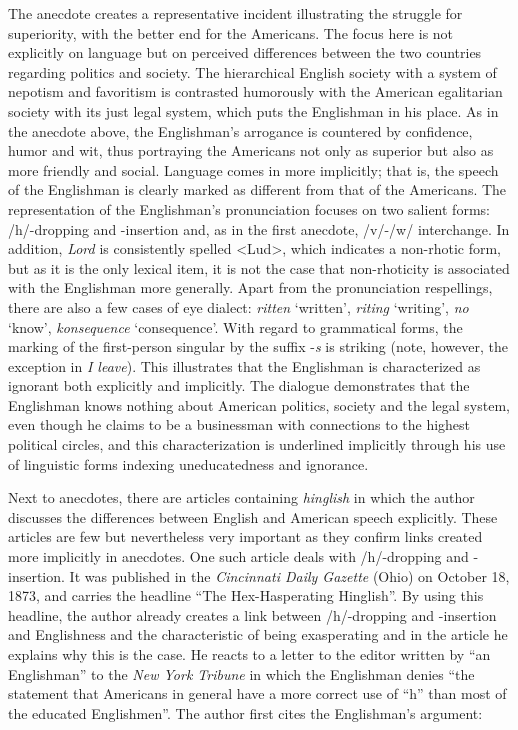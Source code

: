 The anecdote creates a representative incident illustrating the struggle for superiority, with the better end for the Americans. The focus here is not explicitly on language but on perceived differences between the two countries regarding politics and society. The hierarchical English society with a system of nepotism and favoritism is contrasted humorously with the American egalitarian society with its just legal system, which puts the Englishman in his place. As in the anecdote above, the Englishman’s arrogance is countered by confidence, humor and wit, thus portraying the Americans not only as superior but also as more friendly and social. Language comes in more implicitly; that is, the speech of the Englishman is clearly marked as different from that of the Americans. The representation of the Englishman’s pronunciation focuses on two salient forms: /h/-dropping and -insertion and, as in the first anecdote, /v/-/w/ interchange. In addition, \emph{Lord} is consistently spelled <Lud>, which indicates a non-rhotic form, but as it is the only lexical item, it is not the case that non-rhoticity is associated with the Englishman more generally. Apart from the pronunciation respellings, there are also a few cases of eye dialect: \emph{ritten} ‘written’, \emph{riting} ‘writing’, \emph{no} ‘know’, \emph{konsequence} ‘consequence’. With regard to grammatical forms, the marking of the first-person singular by the suffix -\emph{s} is striking (note, however, the exception in \emph{I leave}). This illustrates that the Englishman is characterized as ignorant both explicitly and implicitly. The dialogue demonstrates that the Englishman knows nothing about American politics, society and the legal system, even though he claims to be a businessman with connections to the highest political circles, and this characterization is underlined implicitly through his use of linguistic forms indexing uneducatedness and ignorance.


Next to anecdotes, there are articles containing \emph{hinglish} in which the author discusses the differences between English and American speech explicitly. These articles are few but nevertheless very important as they confirm links created more implicitly in anecdotes. One such article deals with /h/-dropping and -insertion. It was published in the \emph{Cincinnati Daily Gazette} (Ohio) on October 18, 1873, and carries the headline “The Hex-Hasperating Hinglish”. By using this headline, the author already creates a link between /h/-dropping and -insertion and Englishness and the characteristic of being exasperating and in the article he explains why this is the case. He reacts to a letter to the editor written by “an Englishman” to the \emph{New York Tribune} in which the Englishman denies “the statement that Americans in general have a more correct use of “h” than most of the educated Englishmen”. The author first cites the Englishman’s argument:

